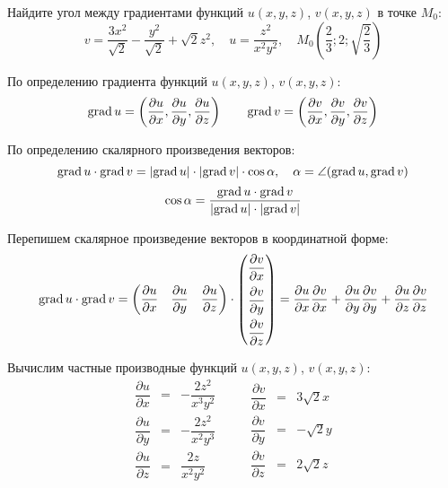 \begin{problem}
Найдите угол между градиентами функций \( u(x,y,z) \), \( v(x,y,z) \) в точке \( M_0 \):
\[ v = \frac{3x^2}{\sqrt{2}} - \frac{y^2}{\sqrt{2}} + \sqrt{2}z^{2}, \quad u = \frac{z^2}{x^2y^2}, \quad M_0\left(\frac{2}{3};2;\sqrt{\frac{2}{3}}\right) \]
\end{problem}

\begin{solution}
  По определению градиента функций \( u(x,y,z) \), \( v(x,y,z) \):
  \[ \textrm{grad}\, u=\left(\dfrac{\partial u}{\partial x},\dfrac{\partial u}{\partial y},\dfrac{\partial u}{\partial z}\right)\qquad\textrm{grad}\, v=\left(\dfrac{\partial v}{\partial x},\dfrac{\partial v}{\partial y},\dfrac{\partial v}{\partial z}\right) \]
  
  По определению скалярного произведения векторов:
  \[
  \textrm{grad}\, u\cdot\textrm{grad}\, v = \left|\textrm{grad}\, u\right|\cdot\left|\textrm{grad}\, v\right|\cdot\cos\alpha, \quad \alpha = \angle(\textrm{grad}\, u, \textrm{grad}\, v)
  \]
  \begin{equation}
  \cos\alpha = \dfrac{\textrm{grad}\, u\cdot\textrm{grad}\, v}{\left|\textrm{grad}\, u\right|\cdot\left|\textrm{grad}\, v\right|} \label{eq:cos_alpha}
  \end{equation}
  
  Перепишем скалярное произведение векторов в координатной форме:
  \begin{equation}
  \textrm{grad}\, u\cdot\textrm{grad}\, v =
  \begin{pmatrix}
  \dfrac{\partial u}{\partial x} & \dfrac{\partial u}{\partial y} & \dfrac{\partial u}{\partial z}
  \end{pmatrix}
  \cdot
  \begin{pmatrix}
  \dfrac{\partial v}{\partial x} \\[2ex]
  \dfrac{\partial v}{\partial y} \\[2ex]
  \dfrac{\partial v}{\partial z}
  \end{pmatrix}
  =
  \frac{\partial u}{\partial x}\frac{\partial v}{\partial x}
  + \frac{\partial u}{\partial y}\frac{\partial v}{\partial y}
  + \frac{\partial u}{\partial z}\frac{\partial v}{\partial z}
  \label{eq:grad_dot_product}
  \end{equation}
  
  Вычислим частные производные функций \( u(x,y,z) \), \( v(x,y,z) \):
  \[
  \begin{array}{rcl}
  \dfrac{\partial u}{\partial x} & = & -\dfrac{2z^2}{x^3y^2} \\[2ex]
  \dfrac{\partial u}{\partial y} & = & -\dfrac{2z^2}{x^2y^3} \\[2ex]
  \dfrac{\partial u}{\partial z} & = & \dfrac{2z}{x^2y^2}
  \end{array}
  \quad\quad
  \begin{array}{rcl}
  \dfrac{\partial v}{\partial x} & = & 3\sqrt{2}x \\[2ex]
  \dfrac{\partial v}{\partial y} & = & -\sqrt{2}y \\[2ex]
  \dfrac{\partial v}{\partial z} & = & 2\sqrt{2}z
  \end{array}
  \]
  

\end{solution}
